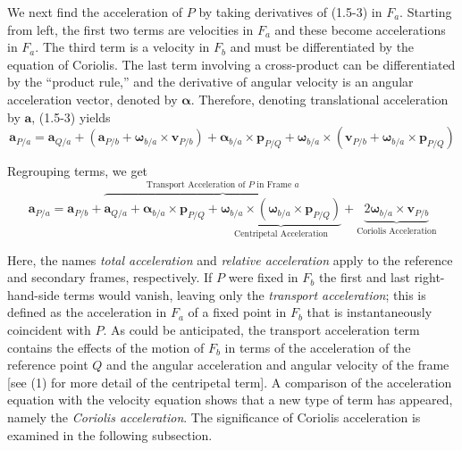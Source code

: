 We next find the acceleration of \(P\) by taking derivatives of (1.5-3) in \(F_{a}\). Starting from left, the first two terms are velocities in \(F_{a}\) and these become accelerations in \(F_{a}\). The third term is a velocity in \(F_{b}\) and must be differentiated by the equation of Coriolis. The last term involving a cross-product can be differentiated by the ``product rule,'' and the derivative of angular velocity is an angular acceleration vector, denoted by \(\mathbf{\alpha}\). Therefore, denoting translational acceleration by \(\mathbf{a}\), (1.5-3) yields
\begin{equation*}
    \mathbf{a}_{P/a} = \mathbf{a}_{Q/a} + \left(\mathbf{a}_{P/b} + \mathbf{\omega}_{b/a}\!\times\!\mathbf{v}_{P/b}\right) + {{\mathbf{\alpha}_{b/a}}\!\times\!{\mathbf{p}_{P/Q}}} + {\mathbf{\omega}_{b/a}}\!\times\!{\left({\mathbf{v}_{P/b}} + {{\mathbf{\omega}_{b/a}}\!\times\!{\mathbf{p}_{P/Q}}}\right)}
\end{equation*}

Regrouping terms, we get
\begin{equation*}
    \mathbf{a}_{P/a} = \mathbf{a}_{P/b} + \overbrace{\mathbf{a}_{Q/a} + {{\mathbf{\alpha}_{b/a}}\!\times\!{\mathbf{p}_{P/Q}}} + \underbrace{{{\mathbf{\omega}_{b/a}}\!\times\!{\left({\mathbf{\omega}_{b/a}}\!\times\!{\mathbf{p}_{P/Q}}\right)}}}_{\text{Centripetal Acceleration}}}^{\text{Transport  Acceleration of \(P\) in Frame \(a\)}} + \underbrace{{2\mathbf{\omega}_{b/a}\!\times\!\mathbf{v}_{P/b}}}_{\text{Coriolis Acceleration}} \tag{1.5-4}
\end{equation*}

Here, the names \textit{total acceleration} and \textit{relative acceleration} apply to the reference and secondary frames, respectively. If \(P\) were fixed in \(F_{b}\) the first and last right-hand-side terms would vanish, leaving only  the \textit{transport acceleration}; this is defined as the acceleration in \(F_{a}\) of a fixed point in \(F_{b}\) that is instantaneously coincident with \(P\). As could be anticipated, the transport acceleration term contains the effects of the motion of \(F_{b}\) in terms of the acceleration of the reference point \(Q\) and the angular acceleration and angular velocity of the frame [see (1) for more detail of the centripetal term]. A comparison of the acceleration equation with the velocity equation shows that a new type of term has appeared, namely the \textit{Coriolis acceleration}. The significance of Coriolis acceleration is examined in the following subsection.


